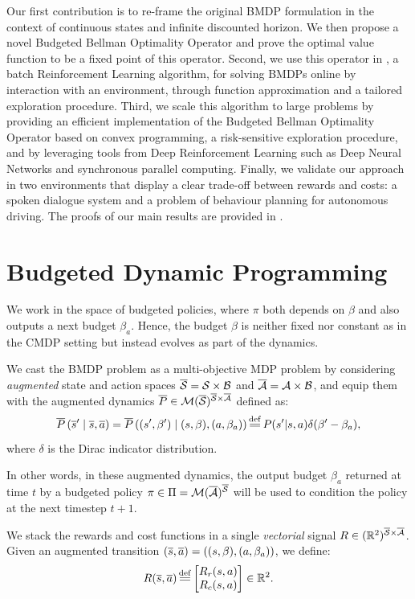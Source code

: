 \documentclass{article}
\begin{document}
Our first contribution is to re-frame the original BMDP formulation in the context of continuous states and infinite discounted horizon. We then propose a novel Budgeted Bellman Optimality Operator and prove the optimal value function to be a fixed point of this operator. Second, we use this operator in \BFTQ, a batch Reinforcement Learning algorithm, for solving BMDPs online by interaction with an environment, through function approximation and a tailored exploration procedure. Third, we scale this algorithm to large problems by providing an efficient implementation of the Budgeted Bellman Optimality Operator based on convex programming, a risk-sensitive exploration procedure, and by leveraging tools from Deep Reinforcement Learning such as Deep Neural Networks and synchronous parallel computing. Finally, we validate our approach in two environments that display a clear trade-off between rewards and costs: a spoken dialogue system and a problem of behaviour planning for autonomous driving. The proofs of our main results are provided in .

\section{Budgeted Dynamic Programming}
\label{sec:bdp}
 We work in the space of budgeted policies, where $\pi$ both depends on $\beta$ and also outputs a next budget $\beta_a$. Hence, the budget $\beta$ is neither fixed nor constant as in the CMDP setting but instead evolves as part of the dynamics.

We cast the BMDP problem as a multi-objective MDP problem \citep{Roijers2013ASO} by considering \emph{augmented} state and action spaces $\overline{\mathcal{S}} = \mathcal{S}\times \mathcal{B}$ and $\overline{\mathcal{A}}= \mathcal{A}\times \mathcal{B}$, and equip them with the augmented dynamics $\overline{P}\in \mathcal{M}(\overline{\mathcal{S}})^{\overline{\mathcal{S}} \times \overline{\mathcal{A}}}$ defined as:
    \begin{equation}
        \label{eq:dynamics}
        \ov{P}\left(\os' \condbar \os, \oa\right) = \ov{P}\left((s',\beta') \condbar (s,\beta), (a, \beta_a)\right) \eqdef P(s'|s, a)\delta(\beta' - \beta_a),
    \end{equation}
where $\delta$ is the Dirac indicator distribution.

In other words, in these augmented dynamics, the output budget $\beta_a$ returned at time $t$ by a budgeted policy $\pi\in \Pi=\mathcal{M}(\overline{\mathcal{A}})^{\overline{\mathcal{S}}}$ will be used to condition the policy at the next timestep $t+1$.

We stack the rewards and cost functions in a single \emph{vectorial} signal $R \in (\mathbb{R}^2)^{{\overline{\mathcal{S}} \times \overline{\mathcal{A}}}}$.
Given an augmented transition $(\overline{s}, \overline{a}) =((s,\beta), (a, \beta_a))$, we define:
\begin{equation}
     R(\os, \oa) \eqdef  \begin{bmatrix}
     R_r(s, a)\\
     R_c(s, a)
     \end{bmatrix}\in\Real^2.
\end{equation}
\end{document}
